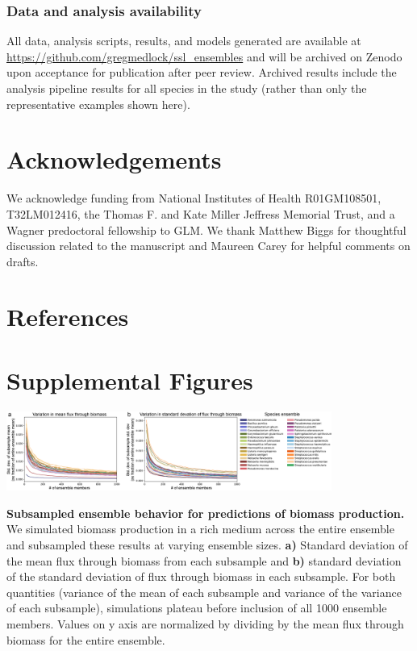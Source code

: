 \documentclass[11pt,twocolumn,notitlepage,openany,twoside]{book}
\begin{document}
\begin{refsection}
\subsubsection{Data and analysis availability}

All data, analysis scripts, results, and models generated are available at \url{https://github.com/gregmedlock/ssl_ensembles} and will be archived on Zenodo upon acceptance for publication after peer review. Archived results include the analysis pipeline results for all species in the study (rather than only the representative examples shown here).

\section{Acknowledgements}

We acknowledge funding from National Institutes of Health R01GM108501, T32LM012416, the Thomas F. and Kate Miller Jeffress Memorial Trust, and a Wagner predoctoral fellowship to GLM. We thank Matthew Biggs for thoughtful discussion related to the manuscript and Maureen Carey for helpful comments on drafts.

\section{References}

\printbibliography[heading=none]

\section{Supplemental Figures}

\begin{suppfigure*}
\centering
\includegraphics[width=0.8\textwidth]{ch3_figS1}
\caption[ Subsampled ensemble behavior for predictions of biomass production.]{\textbf{ Subsampled ensemble behavior for predictions of biomass production.} We simulated biomass production in a rich medium across the entire ensemble and subsampled these results at varying ensemble sizes. \textbf{a)} Standard deviation of the mean flux through biomass from each subsample and \textbf{b)} standard deviation of the standard deviation of flux through biomass in each subsample. For both quantities (variance of the mean of each subsample and variance of the variance of each subsample), simulations plateau before inclusion of all 1000 ensemble members. Values on y axis are normalized by dividing by the mean flux through biomass for the entire ensemble.}
\end{suppfigure*}

\end{refsection}
\end{document}
